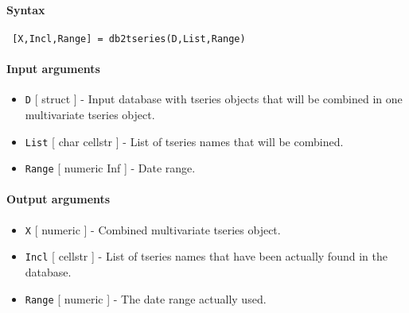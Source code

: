


	\paragraph{Syntax}
 
 \begin{verbatim}
 [X,Incl,Range] = db2tseries(D,List,Range)
 \end{verbatim}
 
 \paragraph{Input arguments}
 
 \begin{itemize}
 \item
   \texttt{D} {[} struct {]} - Input database with tseries objects that
   will be combined in one multivariate tseries object.
 \item
   \texttt{List} {[} char \textbar{} cellstr {]} - List of tseries names
   that will be combined.
 \item
   \texttt{Range} {[} numeric \textbar{} Inf {]} - Date range.
 \end{itemize}
 
 \paragraph{Output arguments}
 
 \begin{itemize}
 \item
   \texttt{X} {[} numeric {]} - Combined multivariate tseries object.
 \item
   \texttt{Incl} {[} cellstr {]} - List of tseries names that have been
   actually found in the database.
 \item
   \texttt{Range} {[} numeric {]} - The date range actually used.
 \end{itemize}


